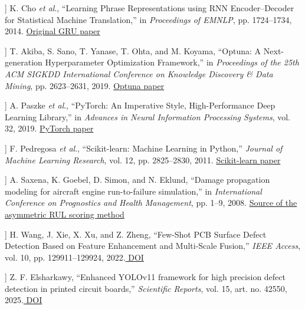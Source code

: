 \documentclass[conference]{IEEEtran}
\begin{document}
\begin{list}{}{\setlength{\leftmargin}{2em}\setlength{\labelwidth}{1.7em}\setlength{\itemsep}{.4ex}\footnotesize}
\item[[9]] K. Cho \textit{et al}., “Learning Phrase Representations using RNN Encoder–Decoder for Statistical Machine Translation,” in \textit{Proceedings of EMNLP}, pp. 1724–1734, 2014. \href{https://aclanthology.org/D14-1179/}{Original GRU paper}

\item[[10]] T. Akiba, S. Sano, T. Yanase, T. Ohta, and M. Koyama, “Optuna: A Next-generation Hyperparameter Optimization Framework,” in \textit{Proceedings of the 25th ACM SIGKDD International Conference on Knowledge Discovery \& Data Mining}, pp. 2623–2631, 2019. \href{https://doi.org/10.1145/3292500.3330701}{Optuna paper}

\item[[11]] A. Paszke \textit{et al}., “PyTorch: An Imperative Style, High-Performance Deep Learning Library,” in \textit{Advances in Neural Information Processing Systems}, vol. 32, 2019. \href{https://papers.nips.cc/paper_files/paper/2019/hash/bdbca288fee7f92f2bfa9f7012727740-Abstract.html}{PyTorch paper}

\item[[12]] F. Pedregosa \textit{et al}., “Scikit-learn: Machine Learning in Python,” \textit{Journal of Machine Learning Research}, vol. 12, pp. 2825–2830, 2011. \href{https://www.jmlr.org/papers/v12/pedregosa11a.html}{Scikit-learn paper}

\item[[13]] A. Saxena, K. Goebel, D. Simon, and N. Eklund, “Damage propagation modeling for aircraft engine run-to-failure simulation,” in \textit{International Conference on Prognostics and Health Management}, pp. 1–9, 2008. \href{https://doi.org/10.1109/PHM.2008.4711414}{Source of the asymmetric RUL scoring method}

\item[[14]] H. Wang, J. Xie, X. Xu, and Z. Zheng, “Few-Shot PCB Surface Defect Detection Based on Feature Enhancement and Multi-Scale Fusion,” \textit{IEEE Access}, vol. 10, pp. 129911–129924, 2022.\href{https://doi.org/10.1109/ACCESS.2022.3228392}{ DOI}

\item[[15]] Z. F. Elsharkawy, “Enhanced YOLOv11 framework for high precision defect detection in printed circuit boards,” \textit{Scientific Reports}, vol. 15, art. no. 42550, 2025.\href{https://doi.org/10.1038/s41598-025-27415-w}{ DOI}

\end{list}

\FloatBarrier
\end{document}
